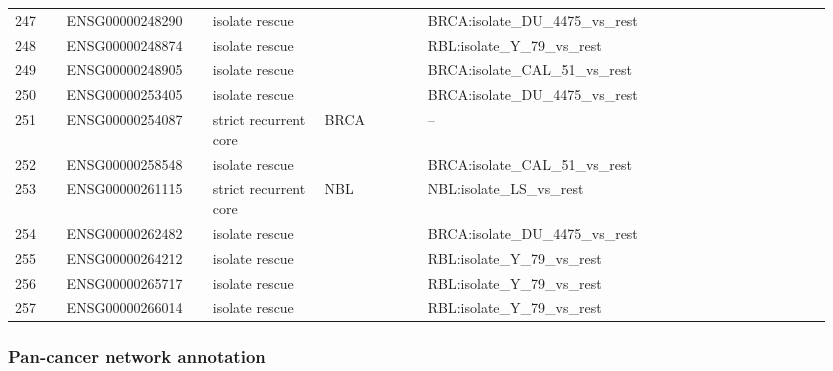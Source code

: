 \begin{landscape}
{\begin{longtable}{p{0.06\linewidth}p{0.17\linewidth}p{0.13\linewidth}p{0.12\linewidth}p{0.47\linewidth}}
247 & ENSG00000248290 & isolate rescue &  & BRCA:isolate\_\allowbreak{}DU\_\allowbreak{}4475\_\allowbreak{}vs\_\allowbreak{}rest \\
248 & ENSG00000248874 & isolate rescue &  & RBL:isolate\_\allowbreak{}Y\_\allowbreak{}79\_\allowbreak{}vs\_\allowbreak{}rest \\
249 & ENSG00000248905 & isolate rescue &  & BRCA:isolate\_\allowbreak{}CAL\_\allowbreak{}51\_\allowbreak{}vs\_\allowbreak{}rest \\
250 & ENSG00000253405 & isolate rescue &  & BRCA:isolate\_\allowbreak{}DU\_\allowbreak{}4475\_\allowbreak{}vs\_\allowbreak{}rest \\
251 & ENSG00000254087 & strict recurrent core & BRCA & -- \\
252 & ENSG00000258548 & isolate rescue &  & BRCA:isolate\_\allowbreak{}CAL\_\allowbreak{}51\_\allowbreak{}vs\_\allowbreak{}rest \\
253 & ENSG00000261115 & strict recurrent core & NBL & NBL:isolate\_\allowbreak{}LS\_\allowbreak{}vs\_\allowbreak{}rest \\
254 & ENSG00000262482 & isolate rescue &  & BRCA:isolate\_\allowbreak{}DU\_\allowbreak{}4475\_\allowbreak{}vs\_\allowbreak{}rest \\
255 & ENSG00000264212 & isolate rescue &  & RBL:isolate\_\allowbreak{}Y\_\allowbreak{}79\_\allowbreak{}vs\_\allowbreak{}rest \\
256 & ENSG00000265717 & isolate rescue &  & RBL:isolate\_\allowbreak{}Y\_\allowbreak{}79\_\allowbreak{}vs\_\allowbreak{}rest \\
257 & ENSG00000266014 & isolate rescue &  & RBL:isolate\_\allowbreak{}Y\_\allowbreak{}79\_\allowbreak{}vs\_\allowbreak{}rest \\
\end{longtable}
}
\end{landscape}

\subsubsection{Pan-cancer network annotation}


